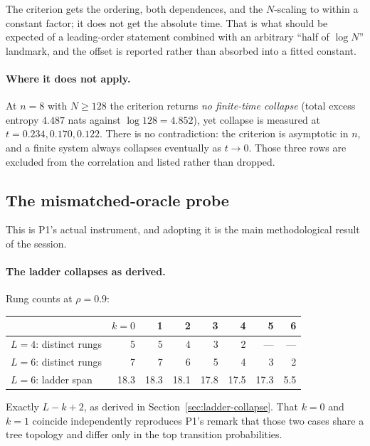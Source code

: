 \documentclass[11pt]{article}
\theoremstyle{remark}
\begin{document}
The criterion gets the ordering, both dependences, and the $N$-scaling to within
a constant factor; it does not get the absolute time. That is what should be
expected of a leading-order statement combined with an arbitrary ``half of
$\log N$'' landmark, and the offset is reported rather than absorbed into a
fitted constant.

\paragraph{Where it does not apply.} At $n=8$ with $N \geq 128$ the criterion
returns \emph{no finite-time collapse} (total excess entropy $4.487$ nats
against $\log 128 = 4.852$), yet collapse is measured at $t = 0.234, 0.170,
0.122$. There is no contradiction: the criterion is asymptotic in $n$, and a
finite system always collapses eventually as $t\to0$. Those three rows are
excluded from the correlation and listed rather than dropped.

\subsection{The mismatched-oracle probe}
\label{sec:exp15}

This is P1's actual instrument, and adopting it is the main methodological
result of the session.

\paragraph{The ladder collapses as derived.} Rung counts at $\rho=0.9$:

\begin{center}
\begin{tabular}{@{}lrrrrrrr@{}}
\toprule
& $k=0$ & 1 & 2 & 3 & 4 & 5 & 6 \\
\midrule
$L=4$: distinct rungs & 5 & 5 & 4 & 3 & 2 & --- & --- \\
$L=6$: distinct rungs & 7 & 7 & 6 & 5 & 4 & 3 & 2 \\
$L=6$: ladder span & 18.3 & 18.3 & 18.1 & 17.8 & 17.5 & 17.3 & 5.5 \\
\bottomrule
\end{tabular}
\end{center}

Exactly $L-k+2$, as derived in Section~\ref{sec:ladder-collapse}. That $k=0$ and
$k=1$ coincide independently reproduces P1's remark that those two cases share a
tree topology and differ only in the top transition probabilities.
\end{document}

